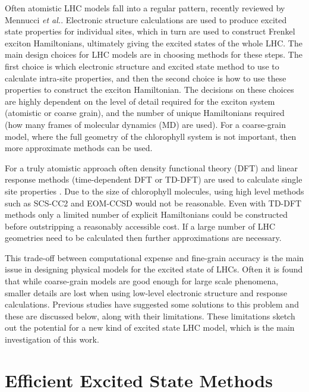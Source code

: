 Often atomistic LHC models fall into a regular pattern, recently reviewed by Mennucci 
\emph{et al.}\cite{Cignoni2022}. Electronic structure calculations are used to
produce excited state properties for individual sites, which in turn are used to
construct Frenkel exciton Hamiltonians, ultimately giving the excited states of
the whole LHC. The main design choices for LHC models are in choosing methods for
these steps. The first choice is which electronic structure and excited state method 
to use to calculate intra-site properties, and then the second choice is how to 
use these properties to construct the exciton Hamiltonian. The decisions on these
choices are highly dependent on the level of detail required for the exciton system
(atomistic or coarse grain), and the number of unique Hamiltonians required (how 
many frames of molecular dynamics (MD) are used). For a coarse-grain model, where
the full geometry of the chlorophyll system is not important, then more approximate 
methods can be used.

For a truly atomistic approach often density functional theory (DFT) and linear 
response methods (time-dependent DFT or TD-DFT) are used to calculate single site
properties \cite{Cignoni2022}. Due to the size of chlorophyll molecules, using high
level methods such as SCS-CC2 and EOM-CCSD would not be reasonable. Even with TD-DFT
methods only a limited number of explicit Hamiltonians could be constructed before
outstripping a reasonably accessible cost. If a large number of LHC geometries need 
to be calculated then further approximations are necessary.

This trade-off between computational expense and fine-grain accuracy is the main
issue in designing physical models for the excited state of LHCs. Often it is found
that while coarse-grain models are good enough for large scale phenomena, smaller
details are lost when using low-level electronic structure and response calculations.
Previous studies have suggested some solutions to this problem and these are discussed
below, along with their limitations. These limitations sketch out the potential 
for a new kind of excited state LHC model, which is the main investigation of this
work.

\section{Efficient Excited State Methods}
\label{sec:efficient_response_methods}

